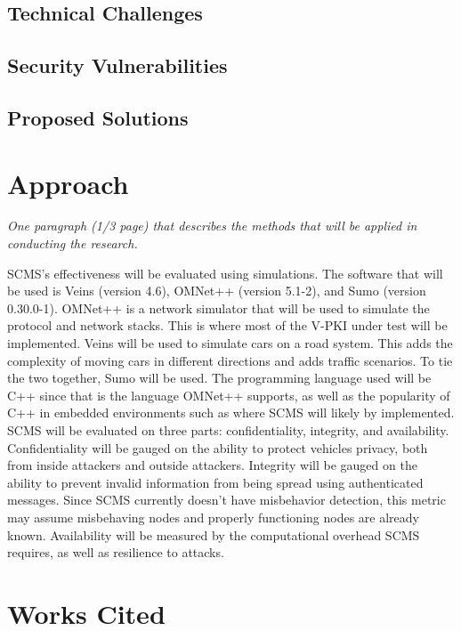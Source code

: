 \documentclass {article}
\newcommand{\sechint}[1]{\small{\emph{#1}} \bigskip}
\begin{document}
\subsection{Technical Challenges}

\subsection{Security Vulnerabilities}

\subsection{Proposed Solutions}

\section{Approach}{\sechint{One paragraph (1/3 page) that describes the methods that will be applied in conducting the research.}}

SCMS's effectiveness will be evaluated using simulations. The software that will be used is Veins (version 4.6), OMNet++ (version 5.1-2), and Sumo (version 0.30.0-1). OMNet++ is a network simulator that will be used to simulate the protocol and network stacks. This is where most of the V-PKI under test will be implemented. Veins will be used to simulate cars on a road system. This adds the complexity of moving cars in different directions and adds traffic scenarios. To tie the two together, Sumo will be used.
The programming language used will be C++ since that is the language OMNet++ supports, as well as the popularity of C++ in embedded environments such as where SCMS will likely by implemented. SCMS will be evaluated on three parts: confidentiality, integrity, and availability. Confidentiality will be gauged on the ability to protect vehicles privacy, both from inside attackers and outside attackers. Integrity will be gauged on the ability to prevent invalid information from being spread using authenticated messages. Since SCMS currently doesn't have misbehavior detection, this metric may assume misbehaving nodes and properly functioning nodes are already known. Availability will be measured by the computational overhead SCMS requires, as well as resilience to attacks.

\pagebreak
\section{Works Cited}
\printbibliography[title={\ }]
\end{document}
